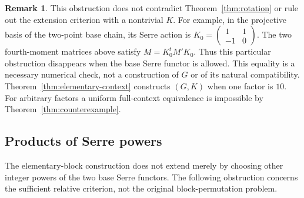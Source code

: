 \documentclass[11pt]{article}
\theoremstyle{definition}
\newtheorem{remark}[theorem]{Remark}
\begin{document}
\begin{remark}
This obstruction does not contradict Theorem~\ref{thm:rotation}
or rule out the extension criterion with a nontrivial $K$.
For example, in the projective basis of the two-point base chain,
its Serre action is
$K_0=\left(\begin{smallmatrix}1&1\\-1&0\end{smallmatrix}\right)$.
The two fourth-moment matrices above satisfy
$M=K_0^t M'K_0$. Thus this particular obstruction disappears when
the base Serre functor is allowed. This equality is a necessary
numerical check, not a construction of $G$ or of its natural
compatibility. Theorem~\ref{thm:elementary-context} constructs
$(G,K)$ when one factor is $10$. For arbitrary factors a uniform
full-context equivalence is impossible by Theorem~\ref{thm:counterexample}.
\end{remark}


\subsection{Products of Serre powers}
The elementary-block construction does not extend merely by choosing
other integer powers of the two base Serre functors. The following
obstruction concerns the sufficient relative criterion, not the
original block-permutation problem.
\end{document}
